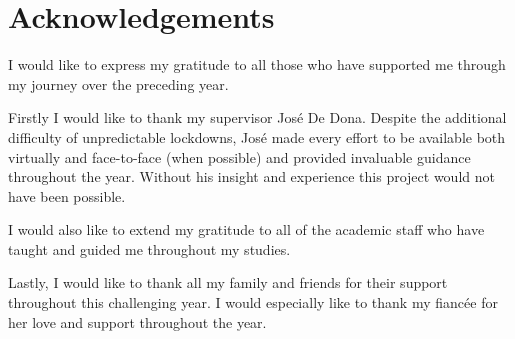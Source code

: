 
\chapter*{Acknowledgements}\label{Acknowledgements}

I would like to express my gratitude to all those who have supported me through my journey over the preceding year.

Firstly I would like to thank my supervisor Jos\'e De Dona. Despite the additional difficulty of unpredictable lockdowns, Jos\'e made every effort to be available both virtually and face-to-face (when possible) and provided invaluable guidance throughout the year. Without his insight and experience this project would not have been possible.

I would also like to extend my gratitude to all of the academic staff who have taught and guided me throughout my studies.

Lastly, I would like to thank all my family and friends for their support throughout this challenging year. I would especially like to thank my fianc\'ee for her love and support throughout the year. 


\clearpage

